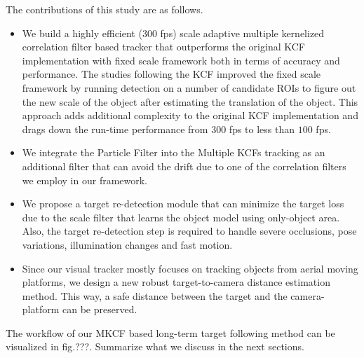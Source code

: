 \documentclass[10pt,twocolumn,letterpaper]{article}
\begin{document}
The contributions of this study are as follows.
\begin{itemize}
\item We build a highly efficient (300 fps) scale adaptive multiple kernelized correlation filter based tracker that outperforms the original KCF implementation with fixed scale framework both in terms of accuracy and performance. The studies following the KCF improved the fixed scale framework by running detection on a number of candidate ROIs to figure out the new scale of the object after estimating the translation of the object. This approach adds additional complexity to the original KCF implementation and drags down the run-time performance from $300$ fps to less than $100$ fps.
\item We integrate the Particle Filter into the Multiple KCFs tracking as an additional filter that can avoid the drift due to one of the correlation filters we employ in our framework.
\item We propose a target re-detection module that can minimize the target loss due to the scale filter that learns the object model using only-object area. Also, the target re-detection step is required to handle severe occlusions, pose variations, illumination changes and fast motion.
\item Since our visual tracker mostly focuses on tracking objects from aerial moving platforms, we design a new robust target-to-camera distance estimation method. This way, a safe distance between the target and the camera-platform can be preserved.
\end{itemize}

The workflow of our MKCF based long-term target following method can be visualized in fig.???. Summarize what we discuss in the next sections.


\small


\end{document}
